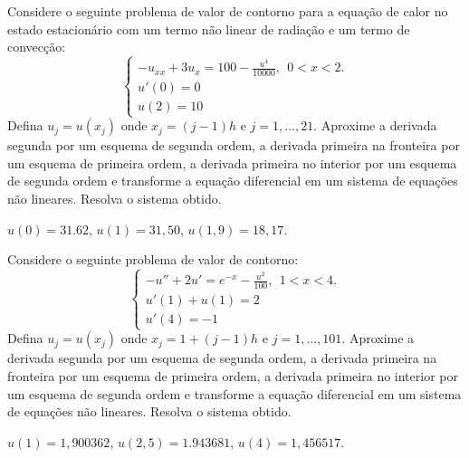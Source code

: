 \begin{exer} Considere o seguinte problema de valor de contorno para a equação de calor no estado estacionário com um termo não linear de radiação e um termo de convecção:
$$\left\{\begin{array}{l}-u_{xx}+3u_x=100- \frac{u^4}{10000},~~ 0<x<2.\\
u'(0)=0\\
u(2)=10\end{array}
\right.
$$
Defina $u_j=u(x_j)$ onde $x_j={(j-1)}{h}$ e $j=1,\ldots,21$. Aproxime a derivada segunda por um esquema de segunda ordem, a derivada primeira na fronteira por um esquema de primeira ordem, a derivada primeira no interior por um esquema de segunda ordem e transforme a equação diferencial em um sistema de equações não lineares. Resolva o sistema  obtido.
\end{exer}
\begin{resp}
$u(0)=31.62$, $u(1)=31,50$, $u(1,9)=18,17$.    
\end{resp}

\begin{exer} Considere o seguinte problema de valor de contorno:
$$\left\{\begin{array}{l}-u''+2u'=e^{-x}- \frac{u^2}{100},~~ 1<x<4.\\
u'(1)+u(1)=2\\
u'(4)=-1\end{array}
\right.
$$
Defina $u_j=u(x_j)$ onde $x_j=1+{(j-1)}{h}$ e $j=1,\ldots,101$. Aproxime a derivada segunda por um esquema de segunda ordem, a derivada primeira na fronteira por um esquema de primeira ordem, a derivada primeira no interior por um esquema de segunda ordem e transforme a equação diferencial em um sistema de equações não lineares. Resolva o sistema  obtido.
\end{exer}
\begin{resp}
$u(1)=1,900362$, $u(2,5)=1.943681$, $u(4)=1,456517$.    
\end{resp}

% 
